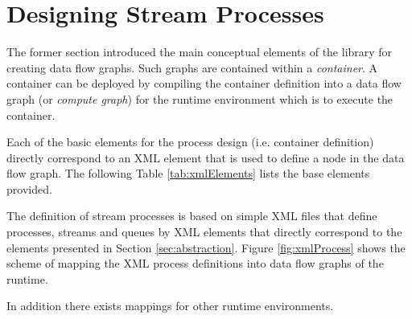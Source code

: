 \newpage
\section{\label{sec:processDesign}Designing Stream Processes}
The former section introduced the main conceptual elements of the
\streams library for creating data flow graphs. Such graphs are
contained within a {\em container}.  A container can be deployed by
compiling the container definition into a data flow graph (or {\em
  compute graph}) for the runtime environment which is to execute the
container.

Each of the basic elements for the process design (i.e. container
definition) directly correspond to an XML element that is used to
define a node in the data flow graph. The following Table
\ref{tab:xmlElements} lists the base elements provided.

\begin{table}[h!]
  \caption{\label{tab:xmlElements}The basic XML element used to define a compute graph within the \streams framework.}
\end{table}



The definition of stream processes is based on simple XML files that
define processes, streams and queues by XML elements that directly
correspond to the elements presented in Section
\ref{sec:abstraction}. Figure \ref{fig:xmlProcess} shows the scheme of
mapping the XML process definitions into data flow graphs of the
\streams runtime.



In addition there exists mappings for other runtime environments.






%